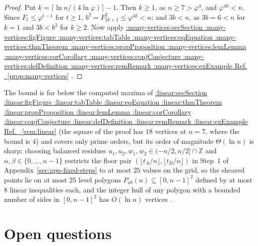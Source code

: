 \documentclass[11pt,a4paper]{article}
\makeatletter
\def\Cref@getprefix#1:#2\relax{#1}
\def\Cref@prefix@sec{sec}
\def\Cref@prefix@fig{fig}
\def\Cref@prefix@tab{tab}
\def\Cref@prefix@eq{eq}
\def\Cref@prefix@thm{thm}
\def\Cref@prefix@prop{prop}
\def\Cref@prefix@lem{lem}
\def\Cref@prefix@cor{cor}
\def\Cref@prefix@conj{conj}
\def\Cref@prefix@def{def}
\def\Cref@prefix@rem{rem}
\def\Cref@prefix@ex{ex}
\def\Cref@type@cap#1{%
  \edef\Cref@tmp{#1}%
  \ifx\Cref@tmp\Cref@prefix@sec Section%
  \else\ifx\Cref@tmp\Cref@prefix@fig Figure%
  \else\ifx\Cref@tmp\Cref@prefix@tab Table%
  \else\ifx\Cref@tmp\Cref@prefix@eq Equation%
  \else\ifx\Cref@tmp\Cref@prefix@thm Theorem%
  \else\ifx\Cref@tmp\Cref@prefix@prop Proposition%
  \else\ifx\Cref@tmp\Cref@prefix@lem Lemma%
  \else\ifx\Cref@tmp\Cref@prefix@cor Corollary%
  \else\ifx\Cref@tmp\Cref@prefix@conj Conjecture%
  \else\ifx\Cref@tmp\Cref@prefix@def Definition%
  \else\ifx\Cref@tmp\Cref@prefix@rem Remark%
  \else\ifx\Cref@tmp\Cref@prefix@ex Example%
  \else Ref.%
  \fi\fi\fi\fi\fi\fi\fi\fi\fi\fi\fi\fi
}
\DeclareRobustCommand{\Cref}[1]{%
  \begingroup
  \edef\Cref@label{#1}%
  \edef\Cref@prefix{\expandafter\Cref@getprefix\Cref@label:\relax}%
  \hyperref[#1]{\Cref@type@cap{\Cref@prefix}~\ref*{#1}}%
  \endgroup
}
\theoremstyle{plain}
\theoremstyle{definition}
\theoremstyle{remark}
\newcommand{\Z}{\mathbb{Z}}
\makeatother
\begin{document}
\begin{proof}
Put $k=\lceil\ln n/(4\ln\varphi)\rceil-1$. Then $k\ge1$, as $n\ge7>\varphi^4$, and $\varphi^{4k}<n$.
Since $F_t\le\varphi^{t-1}$ for $t\ge1$, $b^2=F_{2k+1}^2\le\varphi^{4k}<n$; and $3b<n$, as $3b=6<n$ for $k=1$ and $3b<b^2$ for $k\ge2$.
Now apply \Cref{prop:many-vertices}.
\end{proof}

The bound is far below the computed maxima of \Cref{rem:linear} (the square of the proof has $18$ vertices at $n=7$, where the bound is $4$) and covers only prime orders, but its order of magnitude $\Theta(\ln n)$ is sharp: choosing balanced residues $u_1,u_2,w_1,w_2\in(-n/2,n/2]\cap\Z$ and $\alpha,\beta\in\{0,\dots,n-1\}$ restricts the floor pair $(\lfloor t_A/n\rfloor,\lfloor t_B/n\rfloor)$ in Step~1 of Appendix~\ref{sec:app-fixed-steps} to at most $25$ values on the grid, so the sheared points lie on at most $25$ level polygons $P_{ab}(n)\subseteq[0,n-1]^2$ defined by at most $8$ linear inequalities each, and the integer hull of any polygon with a bounded number of sides in $[0,n-1]^2$ has $O(\ln n)$ vertices \cite[Sect.~2]{zolotykh2006vertices}.

\section{Open questions}
\label{sec:discussion}
\end{document}
